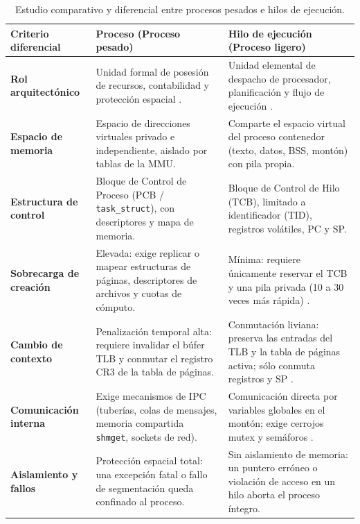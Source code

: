 \documentclass[12pt]{article}
\begin{document}
\clearpage

\begin{table}[htbp]
\centering
\scriptsize
\renewcommand{\arraystretch}{1.06}
\renewcommand{\tabularxcolumn}[1]{m{#1}}
\setlength{\emergencystretch}{1.5em}
\caption{Estudio comparativo y diferencial entre procesos pesados e hilos de ejecución.}
\label{tab:comparativaProcesosHilos}
\begin{tabularx}{\textwidth}{>{\centering\arraybackslash}m{2.5cm} X X}
\toprule
\textbf{Criterio diferencial} & \textbf{Proceso (Proceso pesado)} & \textbf{Hilo de ejecución (Proceso ligero)} \\
\midrule
\textbf{Rol arquitectónico} & Unidad formal de posesión de recursos, contabilidad y protección espacial \parencite[\S 4.1, p.\ 177]{stallings2018operating}. & Unidad elemental de despacho de procesador, planificación y flujo de ejecución \parencite[\S 4.1, p.\ 111]{silberschatz2006fundamentos}. \\
\addlinespace[2pt]
\textbf{Espacio de memoria} & Espacio de direcciones virtuales privado e independiente, aislado por tablas de la MMU. & Comparte el espacio virtual del proceso contenedor (texto, datos, BSS, montón) con pila propia. \\
\addlinespace[2pt]
\textbf{Estructura de control} & Bloque de Control de Proceso (PCB / \texttt{task\_struct}), con descriptores y mapa de memoria. & Bloque de Control de Hilo (TCB), limitado a identificador (TID), registros volátiles, PC y SP. \\
\addlinespace[2pt]
\textbf{Sobrecarga de creación} & Elevada: exige replicar o mapear estructuras de páginas, descriptores de archivos y cuotas de cómputo. & Mínima: requiere únicamente reservar el TCB y una pila privada (10 a 30 veces más rápida) \parencite[\S 4.1, p.\ 179]{stallings2018operating}. \\
\addlinespace[2pt]
\textbf{Cambio de contexto} & Penalización temporal alta: requiere invalidar el búfer TLB y conmutar el registro CR3 de la tabla de páginas. & Conmutación liviana: preserva las entradas del TLB y la tabla de páginas activa; sólo conmuta registros y SP \parencite[\S 3.5.1, p.\ 119]{carretero2001sistemas}. \\
\addlinespace[2pt]
\textbf{Comunicación interna} & Exige mecanismos de IPC (tuberías, colas de mensajes, memoria compartida \texttt{shmget}, sockets de red). & Comunicación directa por variables globales en el montón; exige cerrojos mutex y semáforos \parencite[\S 4.1, p.\ 112]{silberschatz2006fundamentos}. \\
\addlinespace[2pt]
\textbf{Aislamiento y fallos} & Protección espacial total: una excepción fatal o fallo de segmentación queda confinado al proceso. & Sin aislamiento de memoria: un puntero erróneo o violación de acceso en un hilo aborta el proceso íntegro. \\
\bottomrule
\end{tabularx}
\end{table}
\end{document}
